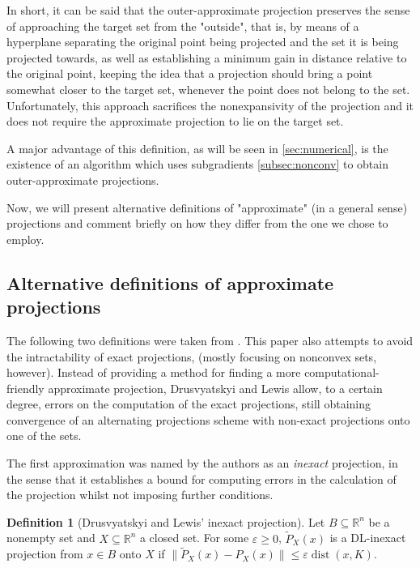 \documentclass[smallextended,numbook,nospthms]{svjour3}
\theoremstyle{plain}
\theoremstyle{definition}
\newtheorem{definition}[theorem]{Definition}
\def\RR{\mathds R}
\DeclareMathOperator{\dist}{dist}
\begin{document}
In short, it can be said that the outer-approximate projection preserves the sense of approaching the target set from the "outside", that is, by means of a hyperplane separating the original point being projected and the set it is being projected towards, as well as establishing a minimum gain in distance relative to the original point, keeping the idea that a projection should bring a point somewhat closer to the target set, whenever the point does not belong to the set. Unfortunately, this approach sacrifices the nonexpansivity of the projection and it does not require the approximate projection to lie on the target set.

A major advantage of this definition, as will be seen in \cref{sec:numerical}, is the existence of an algorithm which uses subgradients \cref{subsec:nonconv} to obtain outer-approximate projections.

Now, we will present alternative definitions of "approximate" (in a general sense) projections and comment briefly on how they differ from the one we chose to employ.

\subsection{Alternative definitions of approximate projections}

The following two definitions were taken from \cite{Drusvyatskiy:2018}. This paper also attempts to avoid the intractability of exact projections, (mostly focusing on nonconvex sets, however). Instead of providing a method for finding a more computational-friendly approximate projection, Drusvyatskyi and Lewis allow, to a certain degree, errors on the computation of the exact projections, still obtaining convergence of an alternating projections scheme with non-exact projections onto one of the sets.

The first approximation was named by the authors as an \emph{inexact} projection, in the sense that it establishes a bound for computing errors in the calculation of the projection whilst not imposing further conditions.

\begin{definition}[Drusvyatskyi and Lewis' inexact projection]
	Let $B \subseteq \RR^{n}$ be a nonempty set and $X \subseteq \RR^{n}$ a closed set. For some $\varepsilon \geq 0$, $\tilde{P}_{X}(x)$ is a DL-inexact projection from $x \in B$ onto $X$ if $\|\tilde{P}_{X}(x)-P_{X}(x)\| \leq \varepsilon \dist(x,K)$.
\end{definition}
\end{document}
